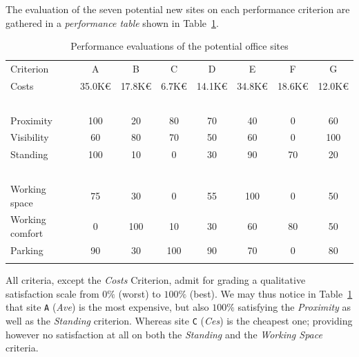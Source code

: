 The evaluation of the seven potential new sites on each performance criterion are gathered in a \emph{performance table} shown in Table~\ref{tab:4.3}.
\begin{table}[h]
\caption{Performance evaluations of the potential office sites}
\label{tab:4.3}       %
\begin{center}
    \begin{tabular}{l|c|c|c|c|c|c|c}
      \svhline\noalign{\smallskip}
    Criterion  &    A  &      B &       C &       D &       E &        F &        G\\
       \noalign{\smallskip}\hline\noalign{\smallskip}

    Costs      &   35.0K€ &  17.8K€  & 6.7K€  &  14.1K€ &  34.8K€ &  18.6K€ &  12.0K€\\
    \          &   \      &  \     &   \     &   \    &    \    &    \    &    \ \\
    Proximity     &   100    &  20 &      80    &   70    &   40    &   0    &    60 \\
    Visibility     &   60     &  80  &     70    &   50    &   60    &   0    &    100 \\
    Standing      &   100   &   10   &    0     &   30    &   90    &   70   &    20 \\
    \           &   \     &   \    &    \     &   \     &   \     &   \    &    \  \\
    Working space      &   75    &   30   &    0     &   55    &   100   &   0    &    50  \\
    Working comfort      &   0     &   100  &    10    &   30    &   60    &   80   &    50 \\
    Parking     &   90    &   30   &    100   &   90    &   70    &   0    &    80 \\
      \noalign{\smallskip}\hline
    \end{tabular}
  \end{center}
\end{table}

All criteria, except the \emph{Costs} Criterion, admit for grading a qualitative satisfaction scale from $0\%$ (worst) to $100\%$ (best). We may thus notice in Table~\ref{tab:4.3} that site \texttt{A} (\emph{Ave}) is the most expensive, but also $100\%$ satisfying the \emph{Proximity} as well as the  \emph{Standing} criterion. Whereas site \texttt{C} (\emph{Ces}) is the cheapest one; providing however no satisfaction at all on both the \emph{Standing} and the \emph{Working Space} criteria.

